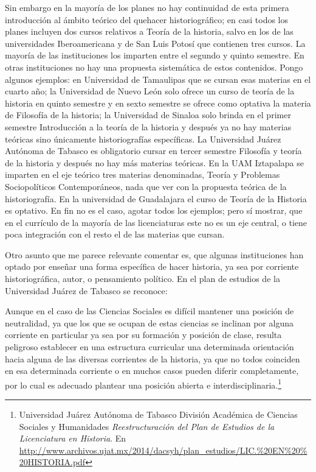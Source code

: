 Sin embargo en la mayoría de los planes no hay continuidad de esta 
primera introducción al ámbito teórico del quehacer historiográfico; en 
casi todos los planes incluyen dos cursos relativos a Teoría de la 
historia, salvo en los de las universidades Iberoamericana y de San 
Luis Potosí que contienen tres cursos. La mayoría de las instituciones 
los imparten entre el segundo y quinto semestre. En otras instituciones 
no hay una propuesta sistemática de estos contenidos. Pongo algunos 
ejemplos: en Universidad de Tamaulipas que se cursan esas materias en 
el cuarto año; la Universidad de Nuevo León solo ofrece un curso de 
teoría de la historia en quinto semestre y en sexto semestre se ofrece 
como optativa la materia de Filosofía de la historia; la Universidad de 
Sinaloa solo brinda en el primer semestre Introducción a la teoría de 
la historia y después ya no hay materias teóricas sino únicamente 
historiografías  específicas. La Universidad Juárez Autónoma de Tabasco 
es obligatorio cursar en tercer semestre Filosofía y teoría de la 
historia y después no hay más materias teóricas. En la UAM Iztapalapa 
se imparten en el eje teórico tres materias denominadas, Teoría y 
Problemas Sociopolíticos Contemporáneos, nada que ver con la propuesta 
teórica de la historiografía. En la universidad de Guadalajara el curso 
de Teoría de la Historia es optativo. En fin no es el caso, agotar 
todos los ejemplos; pero sí mostrar, que en el currículo de la mayoría 
de las licenciaturas este no es un eje central, o tiene poca 
integración con el resto el de las materias que cursan. 

Otro asunto que me parece relevante comentar es, que algunas 
instituciones han optado por enseñar una forma específica de hacer 
historia, ya sea por corriente historiográfica, autor, o pensamiento 
político. En el plan de estudios de la Universidad Juárez de Tabasco se 
reconoce:

Aunque en el caso de las Ciencias Sociales es difícil mantener una 
posición de neutralidad, ya que los que se ocupan de estas ciencias se 
inclinan por alguna corriente en particular ya sea por su formación y 
posición de clase, resulta peligroso establecer en una estructura 
curricular una determinada orientación hacia alguna de las diversas 
corrientes de la historia, ya que no todos coinciden en esa determinada 
corriente o en muchos casos pueden diferir completamente, por lo cual 
es adecuado plantear una posición abierta e 
interdisciplinaria.\footnote{ Universidad Juárez Autónoma de Tabasco 
División Académica de Ciencias Sociales y Humanidades 
\textit{Reestructuración del Plan de Estudios de la Licenciatura en 
Historia}. En 
\url{http://www.archivos.ujat.mx/2014/dacsyh/plan_estudios/LIC.\%20EN\%20\%20HISTORIA.pdf} 
}

